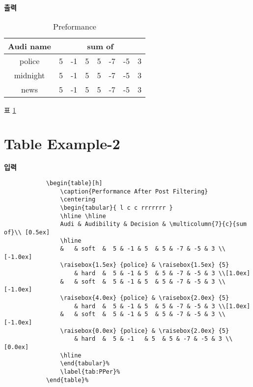 		\textbf{출력}\\
		\vspace{-2.0em}
				\begin{table}[h]
					\caption{Preformance}
					\centering
				    \begin{tabular}{c rrrrrrr }
				    \hline \hline
					Audi name & \multicolumn{7}{c}{ sum of }  \\ [0.5ex]
				    \hline
				    police   	& 5 & -1 & 5  & 5 & -7 & -5 & 3 \\
				    midnight 	& 5 & -1 & 5  & 5 & -7 & -5 & 3 \\
				    news   	& 5 & -1 & 5  & 5 & -7 & -5 & 3 \\
				    \hline
				    \end{tabular}%
				  \label{table:hresult}%
				\end{table}%
				
	표 \ref{table:hresult}
	\doublespacing
		

\newpage 
\section{Table Example-2}
\null

	\singlespacing
	\textbf{입력}\\
		\begin{boxedminipage}[t]{1.0\linewidth}
		\small
		\begin{verbatim}	
			\begin{table}[h]
				\caption{Performance After Post Filtering}
				\centering
				\begin{tabular}{ l c c rrrrrrr }
				\hline \hline
				Audi & Audibility & Decision & \multicolumn{7}{c}{sum of}\\ [0.5ex]
				\hline
				& 	& soft 	&  5 & -1 & 5  & 5 & -7 & -5 & 3 \\[-1.0ex]
				\raisebox{1.5ex} {police} & \raisebox{1.5ex} {5} 
					& hard	&  5 & -1 & 5  & 5 & -7 & -5 & 3 \\[1.0ex]
				& 	& soft 	&  5 & -1 & 5  & 5 & -7 & -5 & 3 \\[-1.0ex]
				\raisebox{4.0ex} {police} & \raisebox{2.0ex} {5} 
					& hard	&  5 & -1 & 5  & 5 & -7 & -5 & 3 \\[1.0ex]
				& 	& soft 	&  5 & -1 & 5  & 5 & -7 & -5 & 3 \\[-1.0ex]
				\raisebox{0.0ex} {police} & \raisebox{2.0ex} {5} 
					& hard	&  5 & -1 	& 5  & 5 & -7 & -5 & 3 \\[0.0ex]
				\hline
				\end{tabular}%
				\label{tab:PPer}%
			\end{table}%
		\end{verbatim} 
		\end{boxedminipage} \\ \\

